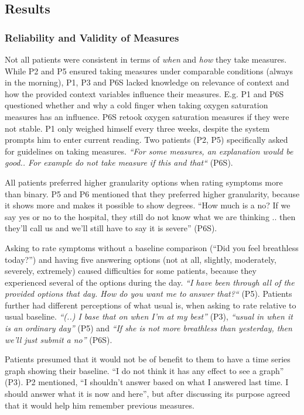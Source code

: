 \subsection{Results}     

\subsubsection{Reliability and Validity of Measures}
Not all patients were consistent in terms of \textit{when} and \textit{how} they take measures. While P2 and P5 ensured taking measures under comparable conditions (always in the morning), P1, P3 and P6S lacked knowledge on relevance of context and how the provided context variables influence their measures. E.g. P1 and P6S questioned whether and why a cold finger when taking oxygen saturation measures has an influence. P6S retook oxygen saturation measures if they were not stable. P1 only weighed himself every three weeks, despite the system prompts him to enter current reading. Two patients (P2, P5) specifically asked for guidelines on taking measures. \textit{“For some measures, an explanation would be good.. For example do not take measure if this and that“} (P6S). 

All patients preferred higher granularity options when rating symptoms more than binary. P5 and P6 mentioned that they preferred higher granularity, because it shows more and makes it possible to show degrees. “How much is a no? If we say yes or no to the hospital, they still do not know what we are thinking .. then they’ll call us and we’ll still have to say it is severe” (P6S). 

Asking to rate symptoms without a baseline comparison (“Did you feel breathless today?”) and having five answering options (not at all, slightly, moderately, severely, extremely) caused difficulties for some patients, because they experienced several of the options during the day. \textit{“I have been through all of the provided options that day. How do you want me to answer that?“} (P5). Patients further had different perceptions of what usual is, when asking to rate relative to usual baseline. \textit{“(..) I base that on when I’m at my best”} (P3), \textit{“usual in when it is an ordinary day”} (P5) and \textit{“If she is not more breathless than yesterday, then we’ll just submit a no”} (P6S). 

Patients presumed that it would not be of benefit to them to have a time series graph showing their baseline. “I do not think it has any effect to see a graph” (P3). P2 mentioned, “I shouldn’t answer based on what I answered last time. I should answer what it is now and here”, but after discussing its purpose agreed that it would help him remember previous measures. 

